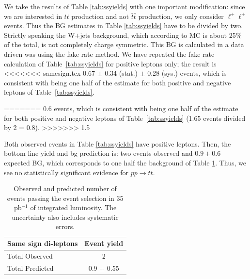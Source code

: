 We take the results of Table \ref{tab:ssyields} with one important modification: 
since we are interested in $tt$ production and not $\bar{t}\bar{t}$ production,
we only consider $\ell^{+}\ell^{+}$ events.  
Thus the BG estimates in Table \ref{tab:ssyields} have to be divided by two.
Strictly speaking the W$+$jets background, which according to MC is about 25\%
of the total, is not completely charge symmetric.  
This BG is calculated in a data 
driven was using the fake rate method.  We have repeated the fake rate calculation
of Table~\ref{tab:ssyields} for positive leptons only; the result is 
<<<<<<< samesign.tex
0.67 $\pm$ 0.34 (stat.) $\pm$ 0.28 (sys.) events, which is consistent with being one half of the estimate for both
positive and negative leptons of Table~\ref{tab:ssyields}.

=======
0.6 events, which is consistent with being one half of the estimate for both
positive and negative leptons of Table~\ref{tab:ssyields} (1.65 events divided
by 2 = 0.8). 
>>>>>>> 1.5

Both observed events in Table \ref{tab:ssyields} have positive leptons.  
Then, the bottom line yield and bg prediction is: 
two events observed and $0.9 \pm 0.6$ expected BG, 
which corresponds to one half the background of Table \ref{tab:sm_preditcion}.
Thus, we see no statistically significant evidence for $pp \to tt$.







\begin{table}[hbt]
\begin{center}
\begin{tabular}{|l|c|}\hline
Same sign di-leptons & Event yield \\ \hline
Total Observed & 2 \\
Total Predicted & 0.9 $\pm$ 0.55 \\
\hline
\end{tabular}
\caption{ Observed and predicted number of events passing the event selection in 35 pb$^{-1}$ of integrated luminosity. 
The uncertainty also includes systematic errors.\label{tab:sm_preditcion}}
\end{center}
\end{table}

